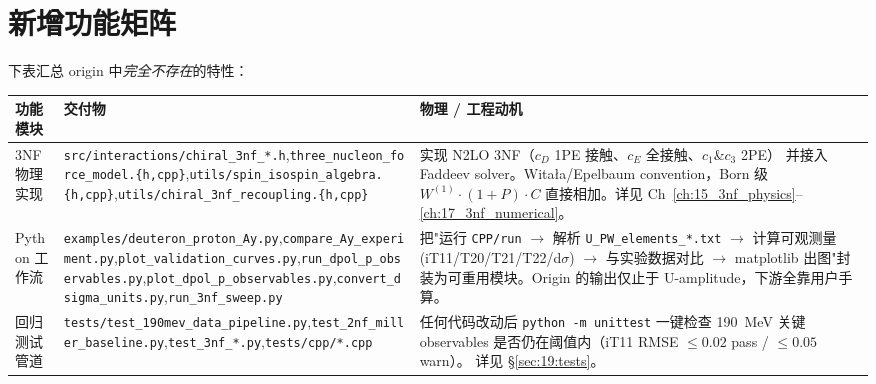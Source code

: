 \section{新增功能矩阵}
\label{sec:19:features}

下表汇总 origin 中\emph{完全不存在}的特性：

\begin{table}[t]
\centering
\small
\begin{tabular}{@{}p{30mm}p{55mm}p{60mm}@{}}
\toprule
\textbf{功能模块} & \textbf{交付物} & \textbf{物理 / 工程动机}\\
\midrule
3NF 物理实现
& \texttt{src/interactions/chiral\_3nf\_*.h},\newline\texttt{three\_nucleon\_force\_model.\{h,cpp\}},\newline\texttt{utils/spin\_isospin\_algebra.\{h,cpp\}},\newline\texttt{utils/chiral\_3nf\_recoupling.\{h,cpp\}}
& 实现 N2LO 3NF（$c_D$ 1PE 接触、$c_E$ 全接触、$c_1$\&$c_3$ 2PE）
  并接入 Faddeev solver。Witała/Epelbaum convention，Born 级
  $W^{(1)}\cdot(1+P)\cdot C$ 直接相加。详见 Ch~\ref{ch:15_3nf_physics}--\ref{ch:17_3nf_numerical}。\\

Python 工作流
& \texttt{examples/deuteron\_proton\_Ay.py},\newline\texttt{compare\_Ay\_experiment.py},\newline\texttt{plot\_validation\_curves.py},\newline\texttt{run\_dpol\_p\_observables.py},\newline\texttt{plot\_dpol\_p\_observables.py},\newline\texttt{convert\_dsigma\_units.py},\newline\texttt{run\_3nf\_sweep.py}
& 把"运行 \texttt{CPP/run} $\to$ 解析 \texttt{U\_PW\_elements\_*.txt}
  $\to$ 计算可观测量 (iT11/T20/T21/T22/d$\sigma$) $\to$ 与实验数据对比 $\to$
  matplotlib 出图"封装为可重用模块。Origin 的输出仅止于
  U-amplitude，下游全靠用户手算。\\

回归测试管道
& \texttt{tests/test\_190mev\_data\_pipeline.py},\newline\texttt{test\_2nf\_miller\_baseline.py},\newline\texttt{test\_3nf\_*.py},\newline\texttt{tests/cpp/*.cpp}
& 任何代码改动后 \texttt{python -m unittest} 一键检查 190~MeV 关键
  observables 是否仍在阈值内（iT11 RMSE $\le 0.02$ pass / $\le 0.05$ warn）。
  详见 §\ref{sec:19:tests}。 \\


\end{tabular}
\end{table}

